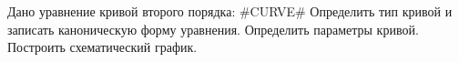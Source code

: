 Дано уравнение кривой второго порядка:
#CURVE#
Определить тип кривой и записать каноническую форму уравнения. Определить параметры кривой. Построить схематический график. 